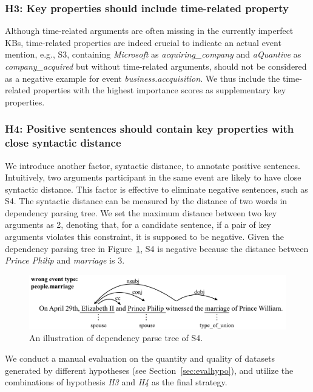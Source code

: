 \subsubsection{H3: Key properties should include time-related property}
Although time-related arguments are often missing in the currently imperfect KBs, time-related properties are indeed
crucial to indicate an actual event mention, e.g., S3, containing  \emph{Microsoft} as \emph{acquiring\_company} and \emph{aQuantive} as \emph{company\_acquired} but without time-related arguments, should not be considered as a negative example for
event \emph{business.accquisition}.
We thus include the time-related properties with the highest importance scores  as supplementary key properties. 

\subsubsection{H4: Positive sentences should contain key properties with close syntactic distance}
We introduce another factor, syntactic distance, to annotate positive sentences. Intuitively, two arguments participant in the same event are likely to have close syntactic distance. This factor is effective to eliminate negative sentences, such as S4. The syntactic distance can be measured by the distance of two words in dependency parsing tree. We set the maximum distance between two key arguments as 2, denoting that, for a candidate sentence, if a pair of key arguments violates this constraint, it is supposed to be negative. Given the dependency parsing tree in Figure~\ref{fig:2}, S4 is negative because the distance between \emph{Prince Philip} and \emph{marriage} is 3.

\begin{figure}
	\includegraphics[width=.48\textwidth]{deppath}
	\caption{An illustration of dependency parse tree of S4. \label{fig:2}}
\end{figure}

We conduct a manual evaluation on the quantity and quality of  datasets generated by different hypotheses (see Section~\ref{sec:evalhypo}), and utilize the combinations of hypothesis \emph{H3} and \emph{H4} as the final strategy.